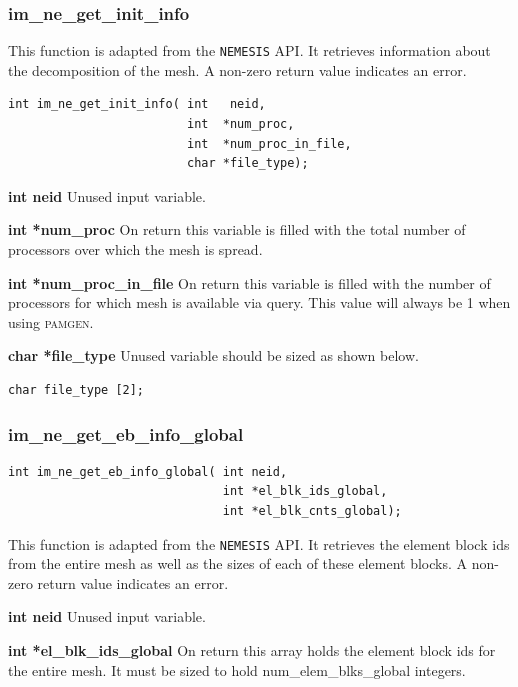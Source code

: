 \subsubsection{im\_ne\_get\_init\_info}
This function is adapted from the \texttt{NEMESIS} API. It retrieves information about the decomposition of the mesh. A non-zero return value indicates an error.
{\ttfamily  \begin{verbatim}
int im_ne_get_init_info( int   neid, 	
                         int  *num_proc,
                         int  *num_proc_in_file,
                         char *file_type);
\end{verbatim}}

{\setlength{\parindent}{0pt}
 \textbf{int neid} Unused input variable.}

{\setlength{\parindent}{0pt}
 \textbf{int *num\_proc} On return this variable is filled with the total number of processors over which the mesh is spread.}

{\setlength{\parindent}{0pt}
 \textbf{int *num\_proc\_in\_file} On return this variable is filled with the number of processors for which mesh is available via query. This value will always be 1 when using \textsc{pamgen}.}

{\setlength{\parindent}{0pt}
 \textbf{char *file\_type} Unused variable should be sized as shown below.}
{\ttfamily 
	\begin{verbatim}char file_type [2];\end{verbatim}}

\subsubsection{im\_ne\_get\_eb\_info\_global}
{\ttfamily  \begin{verbatim}
int im_ne_get_eb_info_global( int neid,
                              int *el_blk_ids_global,
                              int *el_blk_cnts_global);
\end{verbatim}}
This function is adapted from the \texttt{NEMESIS} API. It retrieves the element block ids from the entire mesh as well as the sizes of each of these element blocks. A non-zero return value indicates an error.

{\setlength{\parindent}{0pt}
 \textbf{int neid} Unused input variable.}

{\setlength{\parindent}{0pt}
 \textbf{int *el\_blk\_ids\_global} On return this array holds the element block ids for the entire mesh. It must be sized to hold num\_elem\_blks\_global integers.}

